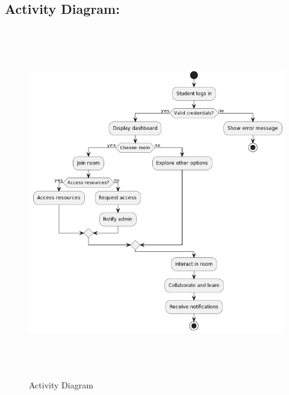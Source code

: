 \subsection{Activity Diagram:}
\begin{figure}[h]
    \centering
    \includegraphics[width=6in, height=6in]{Proposal/static/activity_diagram_sap.png}
    \caption{Activity Diagram}
    \label{fig:enter-label}
\end{figure}
\newpage

